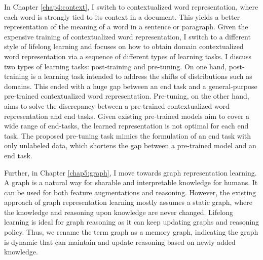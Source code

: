 In Chapter \ref{chap4:context}, I switch to contextualized word representation, where each word is strongly tied to its context in a document.
This yields a better representation of the meaning of a word in a sentence or paragraph.
Given the expensive training of contextualized word representation, I switch to a different style of lifelong learning and focuses on how to obtain domain contextualized word representation via a sequence of different types of learning tasks.
I discuss two types of learning tasks: post-training and pre-tuning.
On one hand, post-training is a learning task intended to address the shifts of distributions such as domains.
This ended with a huge gap between an end task and a general-purpose pre-trained contextualized word representation. 
Pre-tuning, on the other hand, aims to solve the discrepancy between a pre-trained contextualized word representation and end tasks.
Given existing pre-trained models aim to cover a wide range of end-tasks, the learned representation is not optimal for each end task.
The proposed pre-tuning task mimics the formulation of an end task with only unlabeled data, which shortens the gap between a pre-trained model and an end task.

Further, in Chapter \ref{chap5:graph}, I move towards graph representation learning.
A graph is a natural way for sharable and interpretable knowledge for humans.
It can be used for both feature augmentations and reasoning.
However, the existing approach of graph representation learning mostly assumes a static graph, where the knowledge and reasoning upon knowledge are never changed.
Lifelong learning is ideal for graph reasoning as it can keep updating graphs and reasoning policy.
Thus, we rename the term graph as a memory graph, indicating the graph is dynamic that can maintain and update reasoning based on newly added knowledge.

